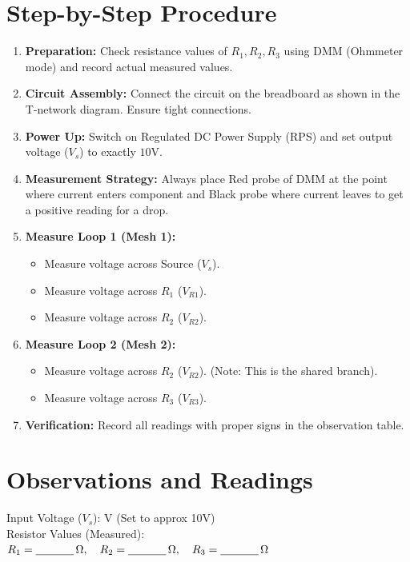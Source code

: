 \section{Step-by-Step Procedure}
\begin{enumerate}
    \item \textbf{Preparation:} Check resistance values of $R_1, R_2, R_3$ using DMM (Ohmmeter mode) and record actual measured values.
    \item \textbf{Circuit Assembly:} Connect the circuit on the breadboard as shown in the T-network diagram. Ensure tight connections.
    \item \textbf{Power Up:} Switch on Regulated DC Power Supply (RPS) and set output voltage ($V_s$) to exactly $10\text{V}$.
    \item \textbf{Measurement Strategy:} Always place Red probe of DMM at the point where current enters component and Black probe where current leaves to get a positive reading for a drop.
    \item \textbf{Measure Loop 1 (Mesh 1):}
    \begin{itemize}
        \item Measure voltage across Source ($V_s$).
        \item Measure voltage across $R_1$ ($V_{R1}$).
        \item Measure voltage across $R_2$ ($V_{R2}$).
    \end{itemize}
    \item \textbf{Measure Loop 2 (Mesh 2):}
    \begin{itemize}
        \item Measure voltage across $R_2$ ($V_{R2}$). (Note: This is the shared branch).
        \item Measure voltage across $R_3$ ($V_{R3}$).
    \end{itemize}
    \item \textbf{Verification:} Record all readings with proper signs in the observation table.
\end{enumerate}

\section{Observations and Readings}

\noindent Input Voltage ($V_s$): \underline{\hspace{1.5cm}} V (Set to approx 10V)\\[4pt]
Resistor Values (Measured): $R_1 = \underline{\hspace{1.2cm}}\,\Omega, \quad R_2 = \underline{\hspace{1.2cm}}\,\Omega, \quad R_3 = \underline{\hspace{1.2cm}}\,\Omega$

